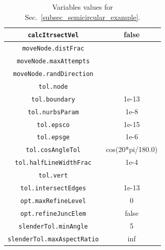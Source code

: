 \documentclass[11pt,letterpaper]{article}
\begin{document}
\begin{table}[!h]
\caption{Variables values for Sec.\ \ref{subsec_semicircular_example}. }

\label{tab_semicircular2}
\centering
\begin{tabular}{|c|c|}
\hline
\texttt{calcItrsectVel}  & false \\
\hline
\texttt{moveNode.distFrac} & \\ 
\hline
\texttt{moveNode.maxAttempts} &  \\
\hline
\texttt{moveNode.randDirection} & \\
\hline 
\texttt{tol.node} & \\
\hline
\texttt{tol.boundary} & 1e-13\\
\hline
\texttt{tol.nurbsParam} & 1e-8\\
\hline
\texttt{tol.epsco} & 1e-15\\
\hline
\texttt{tol.epsge} & 1e-6\\
\hline
\texttt{tol.cosAngleTol} & cos(20*pi/180.0)\\
\hline
\texttt{tol.halfLineWidthFrac} &  1e-4\\
\hline
\texttt{tol.vert} & \\
\hline
\texttt{tol.intersectEdges} & 1e-13\\
\hline
\texttt{opt.maxRefineLevel} & 0\\
\hline
\texttt{opt.refineJuncElem} & false\\
\hline
\texttt{slenderTol.minAngle} & 5\\
\hline
\texttt{slenderTol.maxAspectRatio} & inf\\
\hline
\end{tabular}
\end{table}

\FloatBarrier
\end{document}

